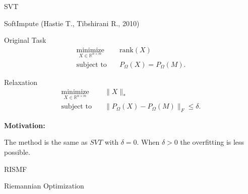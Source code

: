 \documentclass{beamer}
\begin{document}
\begin{frame}{SVT}
\end{frame}
\begin{frame}{SoftImpute (Hastie T., Tibshirani R., 2010)}
\begin{block}{Original Task}
	\vspace{-0.5cm}
		\begin{align*}
		\mathop{\text{minimize}}\limits_{X \in \mathbb{R}^{n \times m}} \quad & 
		\text{rank} (X) \\
		\text{subject to} \quad & P_{\Omega} (X) = P_{\Omega} (M).
		\end{align*}
\end{block}
\begin{block}{Relaxation}
\vspace{-0.5cm}
	\begin{align*}
		\mathop{\text{minimize}}\limits_{X \in \mathbb{R}^{n \times m}} \quad & 
		\| X \|_* \\
		\text{subject to} \quad & \| P_{\Omega} (X) - P_{\Omega} (M) \|_F \leq \delta.
	\end{align*}
\end{block}
	\textbf{Motivation:}
	
		The method is the same as $SVT$ with $\delta = 0$. When $\delta>0$ the overfitting is less possible. 
\end{frame}
\begin{frame}{RISMF}
\end{frame}
\begin{frame}{Riemannian Optimization}
\end{frame}
\end{document}
